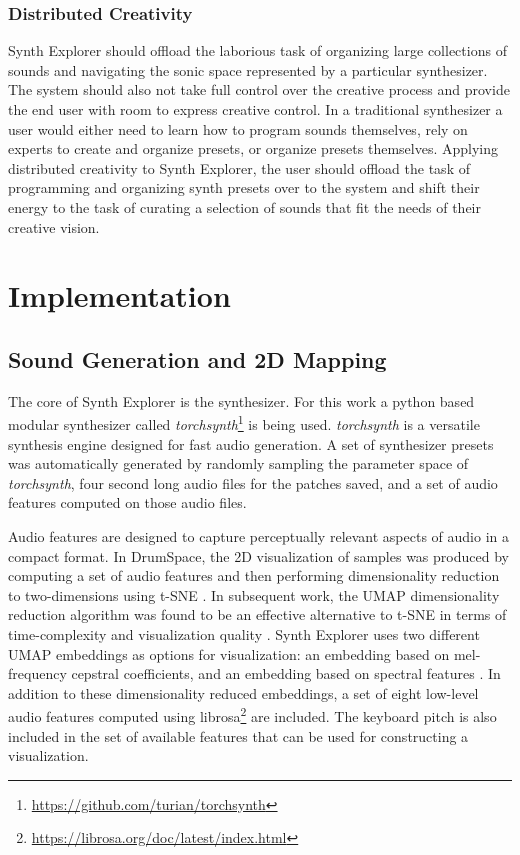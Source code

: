 \subsubsection{Distributed Creativity}
Synth Explorer should offload the laborious task of organizing large collections of sounds and navigating the sonic space represented by a particular synthesizer. The system should also not take full control over the creative process and provide the end user with room to express creative control. In a traditional synthesizer a user would either need to learn how to program sounds themselves, rely on experts to create and organize presets, or organize presets themselves. Applying distributed creativity to Synth Explorer, the user should offload the task of programming and organizing synth presets over to the system and shift their energy to the task of curating a selection of sounds that fit the needs of their creative vision.

\section{Implementation}
\subsection{Sound Generation and 2D Mapping}
The core of Synth Explorer is the synthesizer. For this work a python based modular synthesizer called \textit{torchsynth}\footnote{\url{https://github.com/turian/torchsynth}} is being used. \textit{torchsynth} is a versatile synthesis engine designed for fast audio generation. A set of synthesizer presets was automatically generated by randomly sampling the parameter space of  \textit{torchsynth}, four second long audio files for the patches saved, and a set of audio features computed on those audio files.

Audio features are designed to capture perceptually relevant aspects of audio in a compact format. In DrumSpace, the 2D visualization of samples was produced by computing a set of audio features and then performing dimensionality reduction to two-dimensions using t-SNE \cite{turquois2016exploring, van2008visualizing}. In subsequent work, the UMAP dimensionality reduction algorithm \cite{mcinnes2020umap} was found to be an effective alternative to t-SNE in terms of time-complexity and visualization quality \cite{jiale2020visualization}. Synth Explorer uses two different UMAP embeddings as options for visualization: an embedding based on mel-frequency cepstral coefficients, and an embedding based on spectral features \cite{peeters2004large}. In addition to these dimensionality reduced embeddings, a set of eight low-level audio features computed using librosa\footnote{\url{https://librosa.org/doc/latest/index.html}} are included. The keyboard pitch is also included in the set of available features that can be used for constructing a visualization.

